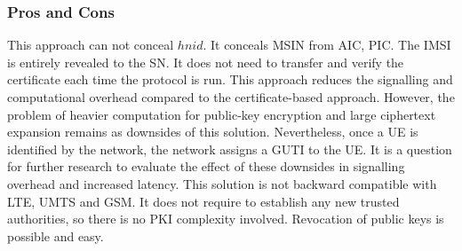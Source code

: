 \documentclass[12pt]{llncs}
\begin{document}
\subsubsection{Pros and Cons}
This approach can not conceal $hnid$. It conceals MSIN from AIC, PIC. The IMSI is entirely revealed to the SN. It does not need to transfer and verify the certificate each time the protocol is run. This approach reduces the signalling and computational overhead compared to the certificate-based approach. However, the problem of heavier computation for public-key encryption and large ciphertext expansion remains as downsides of this solution.  Nevertheless, once a UE is identified by the network, the network assigns a GUTI to the UE. It is a question for further research to evaluate the effect of these downsides in signalling overhead and increased latency. This solution is not backward compatible with LTE, UMTS and GSM. It does not require to establish any new trusted authorities, so there is no PKI complexity involved. Revocation of public keys is possible and easy.
\end{document}
